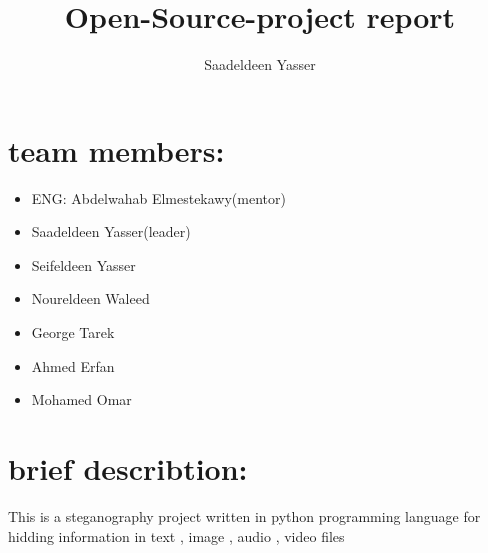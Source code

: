 \documentclass{article}
\begin{document}
\title {Open-Source-project report}
\author{Saadeldeen Yasser}
\maketitle
\section {team members:}
\begin{itemize}
\item ENG: Abdelwahab Elmestekawy(mentor)
\item Saadeldeen Yasser(leader)
\item Seifeldeen Yasser
\item Noureldeen Waleed
\item George Tarek
\item Ahmed Erfan
\item Mohamed Omar
\end{itemize}

\section{brief describtion:}
This is a steganography project written in python programming language for hidding information in text , image , audio , video files
\end{document}
